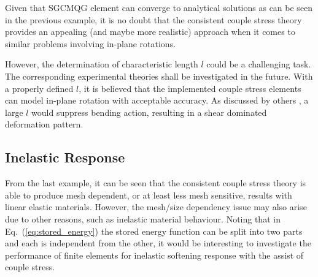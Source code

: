 \documentclass[3p,sort&compress,11pt,fleqn,review]{elsarticle}
\newcommand*{\alert}[1]{#1}
\newcommand*{\eqsref}[1]{Eq.~(\ref{#1})}
\begin{document}
Given that SGCMQG element can converge to analytical solutions as can be seen in the previous example, it is no doubt that the consistent couple stress theory provides an appealing (and maybe more realistic) approach when it comes to similar problems involving in-plane rotations.

However, the determination of characteristic length $l$ could be a challenging task. The corresponding experimental theories shall be investigated in the future. With a properly defined $l$, it is believed that the implemented couple stress elements can model in-plane rotation with acceptable accuracy. As discussed by others \citep[e.g.,][]{Darrall2013}, a large $l$ would suppress bending action, resulting in a shear dominated deformation pattern.
\subsection{Inelastic Response}
\alert{From the last example, it can be seen that the consistent couple stress theory is able to produce mesh dependent, or at least less mesh sensitive, results with linear elastic materials. However, the mesh/size dependency issue may also arise due to other reasons, such as inelastic material behaviour.} Noting that in \eqsref{eq:stored_energy} the stored energy function can be split into two parts and each is independent from the other, it would be interesting to investigate the performance of finite elements for inelastic softening response with the assist of couple stress.
\end{document}
